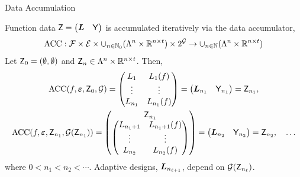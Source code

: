 \documentclass[10pt,compress,xcolor={usenames,dvipsnames},aspectratio=169]{beamer}
\DeclareMathOperator{\DATA}{ACC}
\begin{document}
\begin{frame}{Data Accumulation}

\vspace{-4ex}

Function data $\mathsf{Z} =\begin{pmatrix}\boldsymbol{L} & \mathsf{Y}\end{pmatrix}$ is accumulated iteratively via the \alert{data accumulator},
\[
\DATA: \cf \times  \ce \times\cup_{n \in \natzero} (\Lambda^n \times \reals^{n\times t} ) \times 2^\cg\to  \cup_{n \in \naturals} (\Lambda^n \times \reals^{n\times t})
\]
Let $\mathsf{Z}_0 = (\emptyset, \emptyset)$ and $\mathsf{Z}_n \in \Lambda^n \times \mathbb{R}^{n\times t}$.  Then,
\begin{gather*}
\DATA(f,\veps, \mZ_0, \cg) = 
\begin{pmatrix} L_{1} & L_{1}(f) \\ \vdots & \vdots \\ L_{n_1} & L_{n_1}(f) \end{pmatrix} 
= \begin{pmatrix}
	\vL_{n_1} & \mY_{n_1}
\end{pmatrix}
= \mZ_{n_1}, \\ 
\DATA(f, \veps,\mZ_{n_1}, \cg(\mZ_{n_1})) = 
\begin{pmatrix}\mZ_{n_1} \\ \begin{pmatrix} L_{n_1+1} & L_{n_1+1}(f) \\ \vdots & \vdots \\ L_{n_2} & L_{n_2}(f) \end{pmatrix}  \end{pmatrix} 
= \begin{pmatrix}
	\vL_{n_2} & \mY_{n_2}
\end{pmatrix}
= \mZ_{n_2}, \quad \ldots
\end{gather*}
where $0 < n_1 < n_2 < \cdots$.  \alert{Adaptive} designs, $\boldsymbol{L}_{n_{\ell+1}}$, depend  on $ \mathcal{G}(\mathsf{Z}_{n_\ell})$.

\end{frame}
\end{document}
